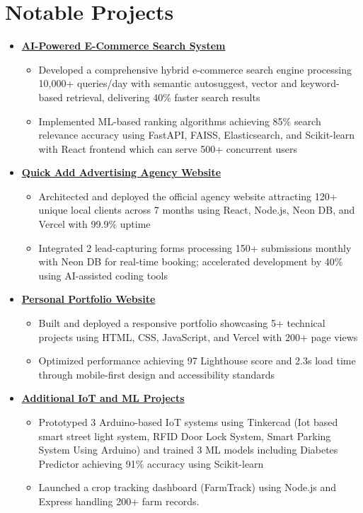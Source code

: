 \documentclass[a4paper,10pt]{article}
\newcommand{\resumeItem}[1]{\item\small{#1}\vspace{2pt}}
\newcommand{\resumeProjectHeading}[2]{
  \item 
    \textbf{\href{#2}{#1}} \small\faExternalLink \vspace{1pt}
}
\newcommand{\resumeSubHeadingListStart}{\begin{itemize}[leftmargin=0.15in, label={}]}
\newcommand{\resumeSubHeadingListEnd}{\end{itemize}\vspace{1pt}}
\newcommand{\resumeItemListStart}{\begin{itemize}[leftmargin=*]}
\newcommand{\resumeItemListEnd}{\end{itemize}\vspace{-2pt}}
\begin{document}
\section{Notable Projects}
  \resumeSubHeadingListStart
    \resumeProjectHeading
      {AI-Powered E-Commerce Search System}{https://github.com/KrishnaRandad2023/search_system}
      \resumeItemListStart
        \resumeItem{Developed a comprehensive hybrid e-commerce search engine processing 10,000+ queries/day with semantic autosuggest, vector and keyword-based retrieval, delivering 40\% faster search results}
        \resumeItem{Implemented ML-based ranking algorithms achieving 85\% search relevance accuracy using FastAPI, FAISS, Elasticsearch, and Scikit-learn with React frontend which can serve 500+ concurrent users}
      \resumeItemListEnd

    \resumeProjectHeading
      {Quick Add Advertising Agency Website}{https://quick-add.me}
      \resumeItemListStart
        \resumeItem{Architected and deployed the official agency website attracting 120+ unique local clients across 7 months using React, Node.js, Neon DB, and Vercel with 99.9\% uptime}
        \resumeItem{Integrated 2 lead-capturing forms processing 150+ submissions monthly with Neon DB for real-time booking; accelerated development by 40\% using AI-assisted coding tools}
      \resumeItemListEnd

    \resumeProjectHeading
      {Personal Portfolio Website}{https://krishnarandad.vercel.app}
      \resumeItemListStart
        \resumeItem{Built and deployed a responsive portfolio showcasing 5+ technical projects using HTML, CSS, JavaScript, and Vercel with 200+ page views}
        \resumeItem{Optimized performance achieving 97 Lighthouse score and 2.3s load time through mobile-first design and accessibility standards}
      \resumeItemListEnd

    \resumeProjectHeading
      {Additional IoT and ML Projects}{https://other-projects-eight.vercel.app/}
      \resumeItemListStart
        \resumeItem{Prototyped 3 Arduino-based IoT systems using Tinkercad (Iot based smart street light system, RFID Door Lock System, Smart Parking System Using Arduino) and trained 3 ML models including Diabetes Predictor achieving 91\% accuracy using Scikit-learn}
        \resumeItem{Launched a crop tracking dashboard (FarmTrack) using Node.js and Express handling 200+ farm records.}
      \resumeItemListEnd

  \resumeSubHeadingListEnd
\end{document}
